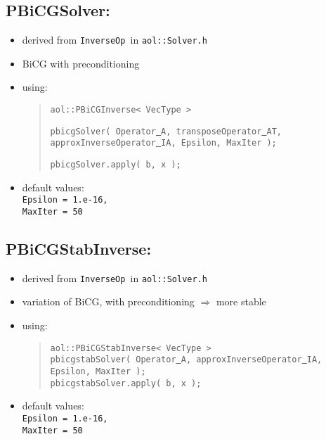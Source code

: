 
\subsection{ PBiCGSolver:}
\begin{itemize}
\item derived from {\tt InverseOp }in {\tt aol::Solver.h}
\item BiCG with preconditioning
\item using: \begin{quote}
{\tt aol::PBiCGInverse< VecType > }
\begin{flushright} {\tt pbicgSolver( Operator\underline{ }A, transposeOperator\underline{ }AT, approxInverseOperator\underline{ }IA, Epsilon, MaxIter );}
\end{flushright}
{\tt pbicgSolver.apply( b, x );}\end{quote}
\item default values: \\
{\tt Epsilon = 1.e-16, \\ MaxIter = 50}
\end{itemize}



\subsection{ PBiCGStabInverse: }
\begin{itemize}
\item derived from {\tt InverseOp }in {\tt aol::Solver.h}
\item variation of BiCG, with preconditioning $\Rightarrow$ more stable
\item using: \begin{quote}
{\tt aol::PBiCGStabInverse< VecType > \\
pbicgstabSolver( Operator\underline{ }A, approxInverseOperator\underline{ }IA, Epsilon, MaxIter ); \\
pbicgstabSolver.apply( b, x ); }
\end{quote}
\item default values: \\
{\tt Epsilon = 1.e-16, \\ MaxIter = 50}
\end{itemize}




